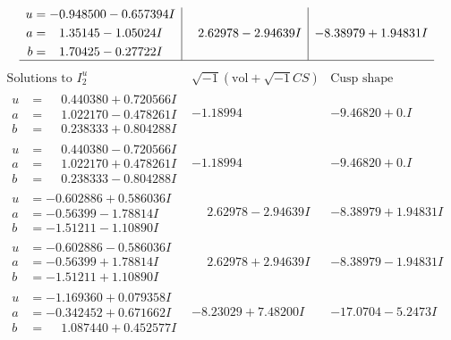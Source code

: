 \documentclass[1p]{elsarticle_modified}
\theoremstyle{definition}
\newcommand{\I}{\sqrt{-1}}
\begin{document}
$$\begin{array}{c|c|c}
\begin{aligned}
u &= -0.948500 - 0.657394 I \\
a &= \phantom{-}1.35145 - 1.05024 I \\
b &= \phantom{-}1.70425 - 0.27722 I\end{aligned}
 & \phantom{-}2.62978 - 2.94639 I & -8.38979 + 1.94831 I\\
 \hline 
 \end{array}$$\newpage$$\begin{array}{c|c|c}  
\text{Solutions to }I^u_{2}& \I (\text{vol} + \sqrt{-1}CS) & \text{Cusp shape}\\
 \hline 
\begin{aligned}
u &= \phantom{-}0.440380 + 0.720566 I \\
a &= \phantom{-}1.022170 - 0.478261 I \\
b &= \phantom{-}0.238333 + 0.804288 I\end{aligned}
 & -1.18994\phantom{ +0.000000I} & -9.46820 + 0. I\phantom{ +0.000000I} \\ \hline\begin{aligned}
u &= \phantom{-}0.440380 - 0.720566 I \\
a &= \phantom{-}1.022170 + 0.478261 I \\
b &= \phantom{-}0.238333 - 0.804288 I\end{aligned}
 & -1.18994\phantom{ +0.000000I} & -9.46820 + 0. I\phantom{ +0.000000I} \\ \hline\begin{aligned}
u &= -0.602886 + 0.586036 I \\
a &= -0.56399 - 1.78814 I \\
b &= -1.51211 - 1.10890 I\end{aligned}
 & \phantom{-}2.62978 - 2.94639 I & -8.38979 + 1.94831 I \\ \hline\begin{aligned}
u &= -0.602886 - 0.586036 I \\
a &= -0.56399 + 1.78814 I \\
b &= -1.51211 + 1.10890 I\end{aligned}
 & \phantom{-}2.62978 + 2.94639 I & -8.38979 - 1.94831 I \\ \hline\begin{aligned}
u &= -1.169360 + 0.079358 I \\
a &= -0.342452 + 0.671662 I \\
b &= \phantom{-}1.087440 + 0.452577 I\end{aligned}
 & -8.23029 + 7.48200 I & -17.0704 - 5.2473 I \\ \hline\begin{aligned}

\end{aligned}
\end{array}$$
\end{document}

